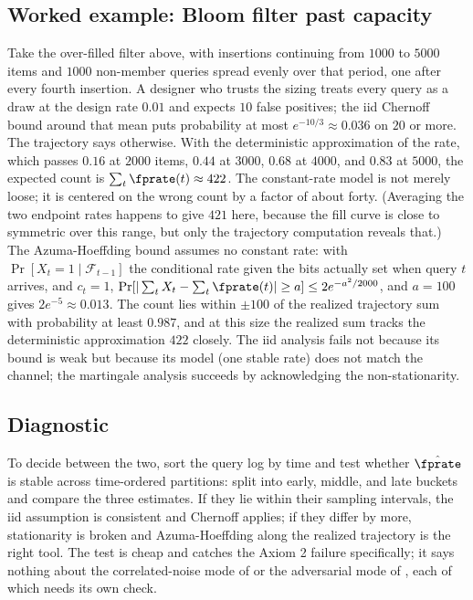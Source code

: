 \subsection*{Worked example: Bloom filter past capacity}

Take the over-filled filter above, with insertions continuing from
$1000$ to $5000$ items and $1000$ non-member queries spread evenly over
that period, one after every fourth insertion. A designer who trusts the
sizing treats every query as a draw at the design rate $0.01$ and expects
$10$ false positives; the iid Chernoff bound around that mean puts
probability at most $e^{-10/3} \approx 0.036$ on $20$ or more. The
trajectory says otherwise. With the deterministic approximation of the
rate, which passes $0.16$ at $2000$ items, $0.44$ at $3000$, $0.68$ at
$4000$, and $0.83$ at $5000$, the expected count is $\sum_t \fprate(t)
\approx 422$. The constant-rate model is not merely loose; it is centered
on the wrong count by a factor of about forty. (Averaging the two endpoint
rates happens to give $421$ here, because the fill curve is close to
symmetric over this range, but only the trajectory computation reveals
that.) The Azuma-Hoeffding bound assumes no constant rate: with
$\Pr[X_t = 1 \mid \mathcal{F}_{t-1}]$ the conditional rate given the bits
actually set when query $t$ arrives, and $c_t = 1$,
$\Pr[|\sum_t X_t - \sum_t \fprate(t)| \ge a] \le 2 e^{-a^2/2000}$, and
$a = 100$ gives $2 e^{-5} \approx 0.013$. The count lies within $\pm 100$
of the realized trajectory sum with probability at least $0.987$, and at
this size the realized sum tracks the deterministic approximation $422$
closely. The iid analysis fails not because its bound is weak but because
its model (one stable rate) does not match the channel; the martingale
analysis succeeds by acknowledging the non-stationarity.

\subsection*{Diagnostic}

To decide between the two, sort the query log by time and test whether
$\hat\fprate$ is stable across time-ordered partitions: split into early,
middle, and late buckets and compare the three estimates. If they lie
within their sampling intervals, the iid assumption is consistent and
Chernoff applies; if they differ by more, stationarity is broken and
Azuma-Hoeffding along the realized trajectory is the right tool. The test
is cheap and catches the Axiom 2 failure specifically; it says nothing
about the correlated-noise mode of  or the
adversarial mode of , each of which needs
its own check.
